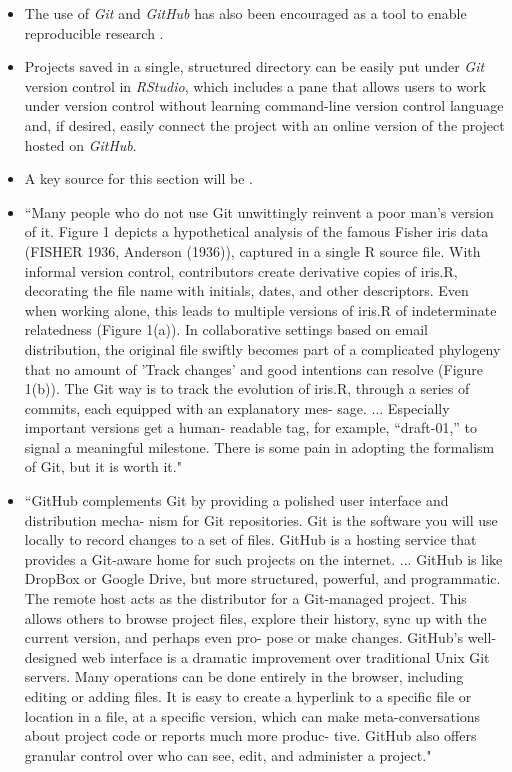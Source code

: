 \documentclass[pdftex,english,11pt,parskip=half]{scrartcl}
\begin{document}
\begin{itemize}
\item The use of \textit{Git} and \textit{GitHub} has also been encouraged as a tool to enable reproducible research \cite{piccolo2016tools, ram2013git, bryan2018excuse, lowndes2017our, cetinkaya2017infrastructure}. 
\item Projects saved in a single, structured directory
can be easily put under \textit{Git} version control in \textit{RStudio}, which
includes a pane that allows users to work under version control without learning
command-line version control language and, if desired, easily connect the
project with an online version of the project hosted on \textit{GitHub}. 
\item A key source for this section will be \cite{bryan2018excuse}. 
\item ``Many people who do not use Git unwittingly reinvent a poor man’s version of it. Figure 1 depicts a hypothetical analysis of the famous Fisher iris data (FISHER 1936, Anderson (1936)), captured in a single R source file. With informal version control, contributors create derivative copies of iris.R, decorating the file name with initials, dates, and other descriptors. Even when working alone, this leads to multiple versions of iris.R of indeterminate relatedness (Figure 1(a)). In collaborative settings based on email distribution, the original file swiftly becomes part of a complicated phylogeny that no amount of 'Track changes' and good intentions can resolve (Figure 1(b)). The Git way is to track the evolution of iris.R, through a series of commits, each equipped with an explanatory mes- sage. ... Especially important versions get a human- readable tag, for example, “draft-01,” to signal a meaningful milestone. There is some pain in adopting the formalism of Git, but it is worth it." \cite{bryan2018excuse} 
\item ``GitHub complements Git by providing a polished user interface and distribution mecha- nism for Git repositories. Git is the software you will use locally to record changes to a set of files. GitHub is a hosting service that provides a Git-aware home for such projects on the internet. ... GitHub is like DropBox or Google Drive, but more structured, powerful, and programmatic. The remote host acts as the distributor for a Git-managed project. This allows others to browse project files, explore their history, sync up with the current version, and perhaps even pro- pose or make changes. GitHub’s well-designed web interface is a dramatic improvement over traditional Unix Git servers. Many operations can be done entirely in the browser, including editing or adding files. It is easy to create a hyperlink to a specific file or location in a file, at a specific version, which can make meta-conversations about project code or reports much more produc- tive. GitHub also offers granular control over who can see, edit, and administer a project." \cite{bryan2018excuse} 

\end{itemize}
\end{document}
